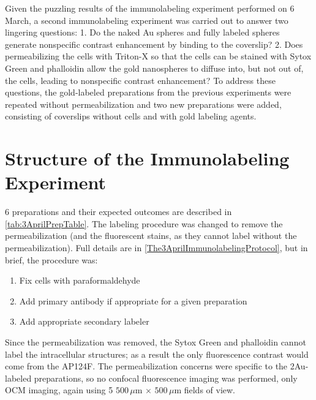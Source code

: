 Given the puzzling results of the immunolabeling experiment performed on 6 March, a second immunolabeling experiment was carried out to answer two lingering questions:
1. Do the naked Au spheres and fully labeled spheres generate nonspecific contrast enhancement by binding to the coverslip?
2. Does permeabilizing the cells with Triton-X so that the cells can be stained with Sytox Green and phalloidin allow the gold nanospheres to diffuse into, but not out of, the cells, leading to nonspecific contrast enhancement?
To address these questions, the gold-labeled preparations from the previous experiments were repeated without permeabilization and two new preparations were added, consisting of coverslips without cells and with gold labeling agents.

\section{Structure of the Immunolabeling Experiment}
\label{structureoftheimmunolabelingexperiment}

6 preparations and their expected outcomes are described in \autoref{tab:3AprilPrepTable}. The labeling procedure was changed to remove the permeabilization (and the fluorescent stains, as they cannot label without the permeabilization). Full details are in \autoref{The3AprilImmunolabelingProtocol}, but in brief, the procedure was:

\begin{enumerate}
\item Fix cells with paraformaldehyde

\item Add primary antibody if appropriate for a given preparation

\item Add appropriate secondary labeler
\end{enumerate}

Since the permeabilization was removed, the Sytox Green and phalloidin cannot label the intracellular structures; as a result the only fluorescence contrast would come from the AP124F. The permeabilization concerns were specific to the 2Au-labeled preparations, so no confocal fluorescence imaging was performed, only OCM imaging, again using 5 $500\,\mu\mathrm{m}\,\times\,500\,\mu\mathrm{m}$ fields of view.

